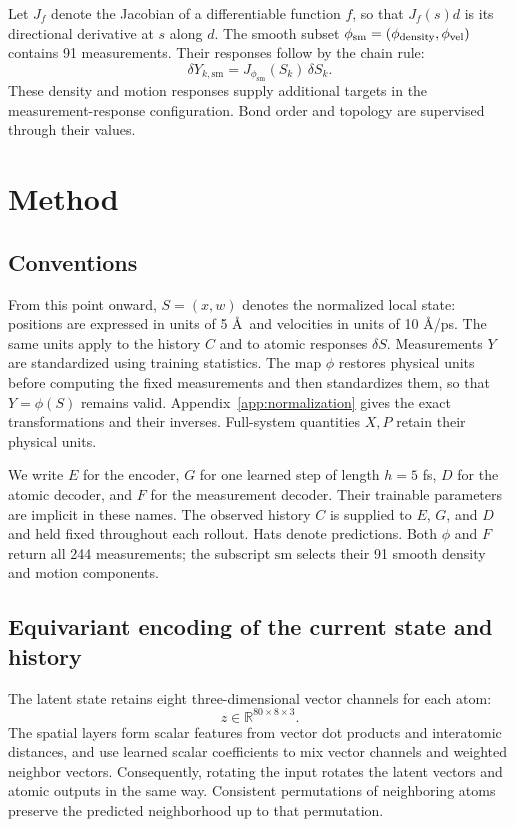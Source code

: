 \documentclass[11pt,a4paper]{article}
\numberwithin{equation}{section}
\newcommand{\R}{\mathbb R}
\newcommand{\sm}{\mathrm{sm}}
\newcommand{\vel}{\mathrm{vel}}
\begin{document}
Let $J_f$ denote the Jacobian of a differentiable function $f$, so that
$J_f(s)d$ is its directional derivative at $s$ along $d$. The smooth subset
$\phi_{\sm}=(\phi_{\rm density},\phi_{\vel})$ contains 91 measurements.
Their responses follow by the chain rule:
\begin{equation}
\boxed{\delta Y_{k,\sm}=J_{\phi_{\sm}}(S_k)\,\delta S_k.}
\label{eq:measurement-response}
\end{equation}
These density and motion responses supply additional targets in the
measurement-response configuration. Bond order and topology are supervised
through their values.

\section{Method}

\subsection{Conventions}

From this point onward, $S=(x,w)$ denotes the normalized local state:
positions are expressed in units of 5 \AA\ and velocities in units of
10 \AA/ps. The same units apply to the history $C$ and to atomic responses
$\delta S$. Measurements $Y$ are standardized using training statistics.
The map $\phi$ restores physical units before computing the fixed measurements
and then standardizes them, so that $Y=\phi(S)$ remains valid.
Appendix~\ref{app:normalization} gives the exact
transformations and their inverses. Full-system quantities $X,P$ retain
their physical units.

We write $E$ for the encoder, $G$ for one learned step of length $h=5$ fs,
$D$ for the atomic decoder, and $F$ for the measurement decoder. Their
trainable parameters are implicit in these names. The observed history $C$
is supplied to $E$, $G$, and $D$
and held fixed throughout each rollout. Hats denote predictions.
Both $\phi$ and $F$ return all 244 measurements; the subscript $\sm$
selects their 91 smooth density and motion components.

\subsection{Equivariant encoding of the current state and history}

The latent state retains eight three-dimensional vector channels for each atom:
\begin{equation}
z\in\R^{80\times8\times3}.
\end{equation}
The spatial layers form scalar features from vector dot products and
interatomic distances, and use learned scalar coefficients to mix vector
channels and weighted neighbor vectors. Consequently, rotating the input
rotates the latent vectors and atomic outputs in the same way. Consistent
permutations of neighboring atoms preserve the predicted neighborhood up
to that permutation.
\end{document}

